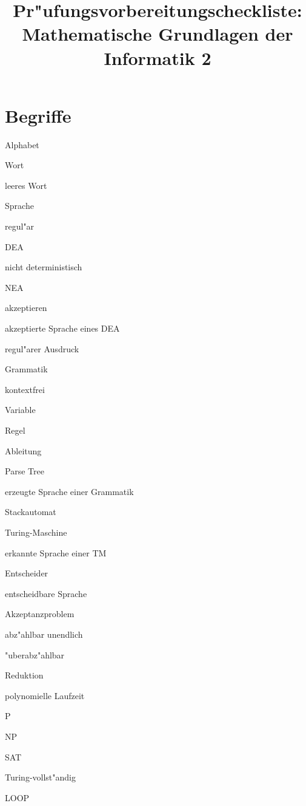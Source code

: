 \documentclass[a4paper,12pt,twocolumn]{article}
\begin{document}
\title{Pr"ufungsvorbereitungscheckliste:\\ Mathematische Grundlagen der Informatik 2}
\date{}
\maketitle
\section{Begriffe}
\begin{compactenum}
\item Alphabet
\item Wort
\item leeres Wort
\item Sprache
\item regul"ar
\item DEA
\item nicht deterministisch
\item NEA
\item akzeptieren
\item akzeptierte Sprache eines DEA
\item regul"arer Ausdruck
\item Grammatik
\item kontextfrei
\item Variable
\item Regel
\item Ableitung
\item Parse Tree
\item erzeugte Sprache einer Grammatik
\item Stackautomat
\item Turing-Maschine
\item erkannte Sprache einer TM
\item Entscheider
\item entscheidbare Sprache
\item Akzeptanzproblem
\item abz"ahlbar unendlich
\item "uberabz"ahlbar
\item Reduktion
\item polynomielle Laufzeit
\item P
\item NP
\item SAT
\item Turing-vollst"andig
\item LOOP
\end{compactenum}
\vfill
\end{document}
